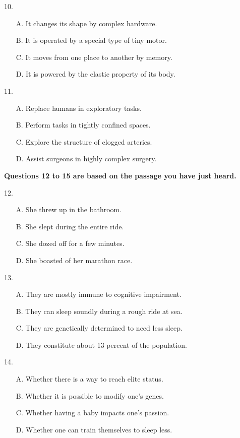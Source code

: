\documentclass[UTF8,11pt]{ctexart}
\begin{document}
10.


\begin{itemize}[leftmargin=2em,itemsep=.2em,topsep=.4em]\item[A.] It changes its shape by complex hardware.
\item[B.] It is operated by a special type of tiny motor.
\item[C.] It moves from one place to another by memory.
\item[D.] It is powered by the elastic property of its body.
\end{itemize}

11.


\begin{itemize}[leftmargin=2em,itemsep=.2em,topsep=.4em]\item[A.] Replace humans in exploratory tasks.
\item[B.] Perform tasks in tightly confined spaces.
\item[C.] Explore the structure of clogged arteries.
\item[D.] Assist surgeons in highly complex surgery.
\end{itemize}

\textbf{Questions 12 to 15 are based on the passage you have just heard.}


12.


\begin{itemize}[leftmargin=2em,itemsep=.2em,topsep=.4em]\item[A.] She threw up in the bathroom.
\item[B.] She slept during the entire ride.
\item[C.] She dozed off for a few minutes.
\item[D.] She boasted of her marathon race.
\end{itemize}

13.


\begin{itemize}[leftmargin=2em,itemsep=.2em,topsep=.4em]\item[A.] They are mostly immune to cognitive impairment.
\item[B.] They can sleep soundly during a rough ride at sea.
\item[C.] They are genetically determined to need less sleep.
\item[D.] They constitute about 13 percent of the population.
\end{itemize}

14.


\begin{itemize}[leftmargin=2em,itemsep=.2em,topsep=.4em]\item[A.] Whether there is a way to reach elite status.
\item[B.] Whether it is possible to modify one’s genes.
\item[C.] Whether having a baby impacts one’s passion.
\item[D.] Whether one can train themselves to sleep less.
\end{itemize}
\end{document}
